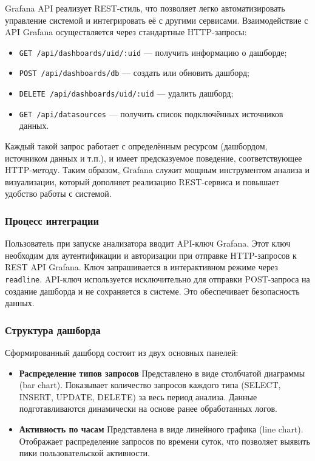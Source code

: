 \documentclass[14pt]{extarticle}
\begin{document}
Grafana API реализует REST-стиль, что позволяет легко автоматизировать управление системой и интегрировать её с другими сервисами. Взаимодействие с API Grafana осуществляется через стандартные HTTP-запросы:

\begin{itemize}
  \item \texttt{GET /api/dashboards/uid/:uid} — получить информацию о дашборде;
  \item \texttt{POST /api/dashboards/db} — создать или обновить дашборд;
  \item \texttt{DELETE /api/dashboards/uid/:uid} — удалить дашборд;
  \item \texttt{GET /api/datasources} — получить список подключённых источников данных.
\end{itemize}

Каждый такой запрос работает с определённым ресурсом (дашбордом, источником данных и т.п.), и имеет предсказуемое поведение, соответствующее HTTP-методу.  
Таким образом, Grafana служит мощным инструментом анализа и визуализации, который дополняет реализацию REST-сервиса и повышает удобство работы с системой.

\subsubsection*{Процесс интеграции}

Пользователь при запуске анализатора вводит API-ключ Grafana. Этот ключ необходим для аутентификации и авторизации при отправке HTTP-запросов к REST API Grafana. Ключ запрашивается в интерактивном режиме через \texttt{readline}.  
API-ключ используется исключительно для отправки POST-запроса на создание дашборда и не сохраняется в системе. Это обеспечивает безопасность данных.

\subsubsection*{Структура дашборда}

Сформированный дашборд состоит из двух основных панелей:

\begin{itemize}
  \item \textbf{Распределение типов запросов}  
  Представлено в виде столбчатой диаграммы (bar chart). Показывает количество запросов каждого типа (SELECT, INSERT, UPDATE, DELETE) за весь период анализа. Данные подготавливаются динамически на основе ранее обработанных логов.
  
  \item \textbf{Активность по часам}  
  Представлена в виде линейного графика (line chart). Отображает распределение запросов по времени суток, что позволяет выявить пики пользовательской активности.
\end{itemize}
\end{document}
